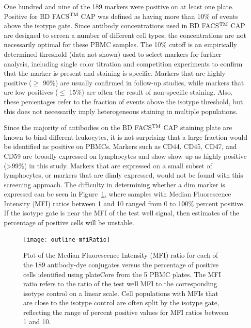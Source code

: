 \documentclass[12pt]{article}
\def\tm{$^{\rm \text{TM }}$}
\begin{document}
One hundred and nine of the 189 markers were positive on at least one plate.
Positive for BD FACS\tm CAP was defined as having more than 10\% of
events above the isotype gate. Since antibody concentrations used in BD FACS\tm CAP are designed
to screen a number of different cell types, the concentrations are not necessarily optimal for these PBMC samples. 
The 10\% cutoff is an empirically determined threshold (data not shown) used to select markers for further analysis,
including single color titration and competition experiments to confirm that the marker is present
and staining is specific. Markers that are highly positive ($\ge$ 90\%) are usually confirmed in
follow-up studies, while markers that are low positives ($\le$ 15\%) are often the result of non-specific
staining. Also, these percentages refer to the fraction of events above the isotype threshold, but
this does not necessarily imply heterogeneous staining in multiple populations.

Since the majority of antibodies on the BD FACS\tm CAP staining plate are known to bind different
leukocytes, it is not surprising that a large fraction would be identified as positive on PBMCs.  Markers such
as CD44, CD45, CD47, and CD59 are broadly expressed on lymphocytes and show show up as highly positive (>99\%)
in this study. Markers that are expressed on a small subset of lymphocytes, or markers that are dimly expressed,
would not be found with this screening approach. The difficulty in determining whether a dim marker
is expressed can be seen in Figure~\ref{fig:mfiRatio}, where samples with Median Fluorescence Intensity (MFI)
ratios between 1 and 10 ranged from 0 to 100\% percent positive.
If the isotype gate is near the MFI of the test well
signal, then estimates of the percentage of positive cells will be unstable.




\clearpage
\begin{figure}
\centering
\texttt{[image: outline-mfiRatio]}
\caption{Plot of the Median Fluorescence Intensity (MFI) ratio for each of the 189 antibody-dye conjugates
versus the percentage of positive cells identified using plateCore from the 5 PBMC plates.
The MFI ratio refers to the ratio of the test well MFI to the corresponding isotype control on a linear scale.
Cell populations with MFIs that are close to the isotype control are often split by the isotype
gate, reflecting the range of percent positive values for MFI ratios between 1 and 10.}
\label{fig:mfiRatio}
\end{figure}
\end{document}
